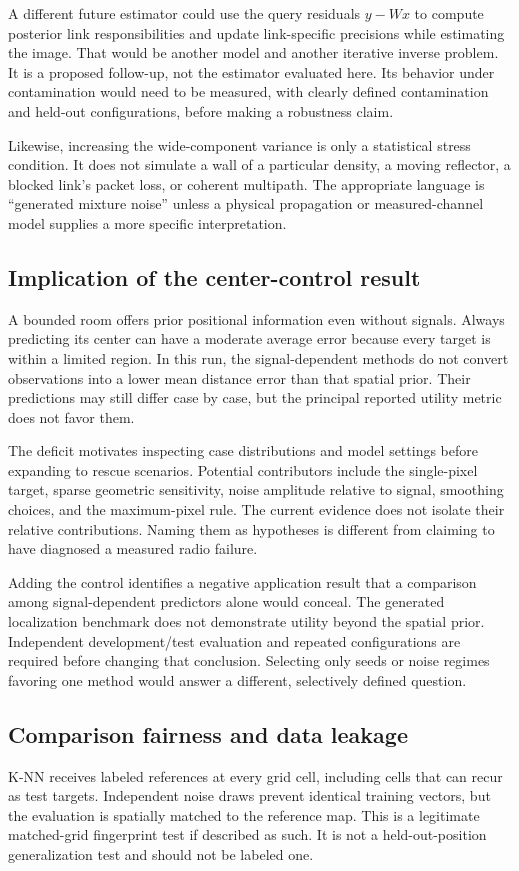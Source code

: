 \documentclass[conference,letterpaper]{IEEEtran}
\begin{document}
A different future estimator could use the query residuals $y-Wx$ to compute posterior link responsibilities and update link-specific precisions while estimating the image. That would be another model and another iterative inverse problem. It is a proposed follow-up, not the estimator evaluated here. Its behavior under contamination would need to be measured, with clearly defined contamination and held-out configurations, before making a robustness claim.

Likewise, increasing the wide-component variance is only a statistical stress condition. It does not simulate a wall of a particular density, a moving reflector, a blocked link's packet loss, or coherent multipath. The appropriate language is ``generated mixture noise'' unless a physical propagation or measured-channel model supplies a more specific interpretation.

\subsection{Implication of the center-control result}
A bounded room offers prior positional information even without signals. Always predicting its center can have a moderate average error because every target is within a limited region. In this run, the signal-dependent methods do not convert observations into a lower mean distance error than that spatial prior. Their predictions may still differ case by case, but the principal reported utility metric does not favor them.

The deficit motivates inspecting case distributions and model settings before expanding to rescue scenarios. Potential contributors include the single-pixel target, sparse geometric sensitivity, noise amplitude relative to signal, smoothing choices, and the maximum-pixel rule. The current evidence does not isolate their relative contributions. Naming them as hypotheses is different from claiming to have diagnosed a measured radio failure.

Adding the control identifies a negative application result that a comparison among signal-dependent predictors alone would conceal. The generated localization benchmark does not demonstrate utility beyond the spatial prior. Independent development/test evaluation and repeated configurations are required before changing that conclusion. Selecting only seeds or noise regimes favoring one method would answer a different, selectively defined question.

\subsection{Comparison fairness and data leakage}
K-NN receives labeled references at every grid cell, including cells that can recur as test targets. Independent noise draws prevent identical training vectors, but the evaluation is spatially matched to the reference map. This is a legitimate matched-grid fingerprint test if described as such. It is not a held-out-position generalization test and should not be labeled one.
\end{document}
